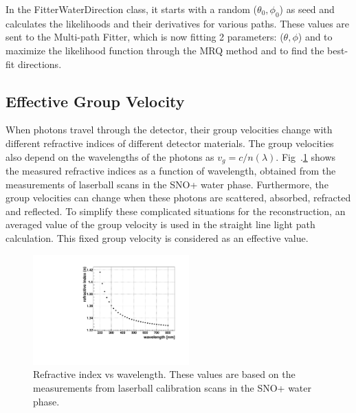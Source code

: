 In the FitterWaterDirection class, it starts with a random ($\theta_0,\phi_0$) as seed and calculates the likelihoods and their derivatives for various paths. These values are sent to the Multi-path Fitter, which is now fitting 2 parameters: ($\theta,\phi$) and to maximize the likelihood function through the MRQ method and to find the best-fit directions.

\subsection{Effective Group Velocity}\label{sect:tuneGroupVelocity}
When photons travel through the detector, their group velocities change with different refractive indices of different detector materials. The group velocities also depend on the wavelengths of the photons as $v_g=c/n(\lambda)$. Fig~.\ref{nVsWavelength} shows the measured refractive indices as a function of wavelength, obtained from the measurements of laserball scans in the SNO+ water phase\cite{laserball_groupVelocity}. Furthermore, the group velocities can change when these photons are scattered, absorbed, refracted and reflected. To simplify these complicated situations for the reconstruction, an averaged value of the group velocity is used in the straight line light path calculation. This fixed group velocity is considered as an effective value.

\begin{figure}[!htb]
	\centering
	\includegraphics[width=6cm]{refractiveIndexVsWavelength.pdf}
	\caption{Refractive index vs wavelength. These values are based on the measurements from laserball calibration scans in the SNO+ water phase\cite{laserball_groupVelocity}.}
	\label{nVsWavelength}
\end{figure}

